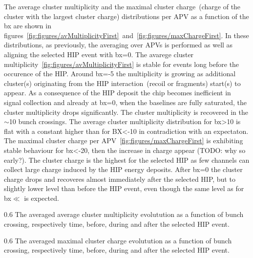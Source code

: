 The average cluster multiplicity and the maximal cluster charge~(charge of the cluster with the largest cluster charge) distributions per APV as a function of the bx are shown in figures~\ref{fig:figures/avMultiplicityFirst}~and~\ref{fig:figures/maxChargeFirst}. In these distributions, as previously, the averaging over APVs is performed as well as aligning the selected HIP event with bx=0. The avarege cluster multiplicity~\ref{fig:figures/avMultiplicityFirst} is stable for events long before the occurence of the HIP. Around bx=-5 the multiplicity is growing as additional cluster(s) originating from the HIP interaction~(recoil or fragments) start(s) to appear. As a consequence of the HIP deposit the chip becomes inefficient in signal collection and already at bx=0, when the baselines are fully saturated, the cluster multiplicity drops significantly. The cluster multiplicity is recovered in the $\sim$10 bunch crossings. The average cluster multiplicity distribution for bx>10 is flat with a constant higher than for BX<-10 in contradiction with an expectaton. The maximal cluster charge per APV~\ref{fig:figures/maxChargeFirst} is exhibiting stable behaviour for bx<-20, then the increase in charge appear (TODO: why so early?). The cluster charge is the highest for the selected HIP as few channels can collect large charge induced by the HIP energy deposits. After bx=0 the cluster charge drops and recoveres almost immediately after the selected HIP, but to slightly lower level than before the HIP event, even though the same level as for bx$\ll$ is expected. 



                 {0.6}       %
                 {The averaged average cluster multiplicity evolutution as a function of bunch crossing, respectively time, before, during and after the selected HIP event. } %

                 {0.6}       %
                 {The averaged maximal cluster charge evolutution as a function of bunch crossing, respectively time, before, during and after the selected HIP event. } %

